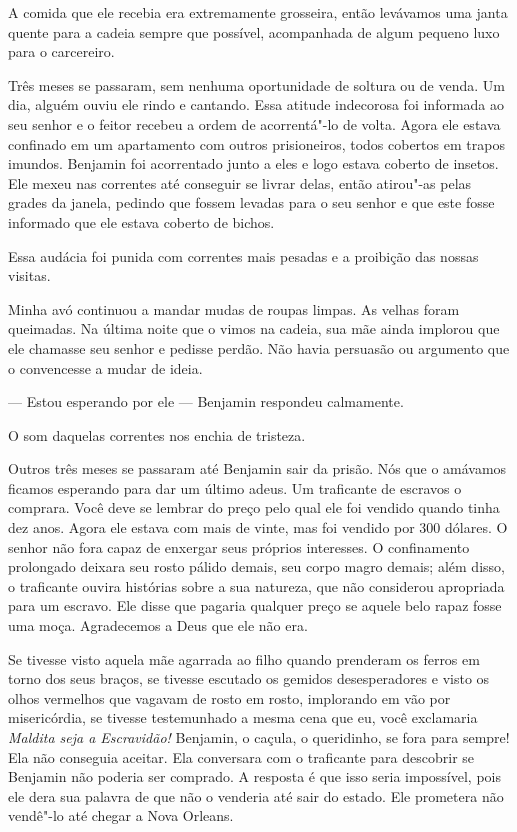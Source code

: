 A comida que ele recebia era
extremamente grosseira, então levávamos uma janta quente para a cadeia
sempre que possível, acompanhada de algum pequeno luxo para o
carcereiro.

Três meses se passaram, sem nenhuma
oportunidade de soltura ou de venda. Um dia, alguém ouviu ele rindo e
cantando. Essa atitude indecorosa foi informada ao seu senhor e o feitor
recebeu a ordem de acorrentá"-lo de volta. Agora ele estava confinado em
um apartamento com outros prisioneiros, todos cobertos em trapos
imundos. Benjamin foi acorrentado junto a eles e logo estava coberto de
insetos. Ele mexeu nas correntes até conseguir se livrar delas, então
atirou"-as pelas grades da janela, pedindo que fossem levadas para o seu
senhor e que este fosse informado que ele estava coberto de bichos.

Essa audácia foi punida com correntes
mais pesadas e a proibição das nossas visitas.

Minha avó continuou a mandar mudas de
roupas limpas. As velhas foram queimadas. Na última noite que o vimos na
cadeia, sua mãe ainda implorou que ele chamasse seu senhor e pedisse
perdão. Não havia persuasão ou argumento que o convencesse a mudar de
ideia.

--- Estou esperando por ele --- Benjamin respondeu calmamente.

O som daquelas correntes nos enchia de
tristeza.

Outros três meses se passaram até
Benjamin sair da prisão. Nós que o amávamos ficamos esperando para dar
um último adeus. Um traficante de escravos o comprara. Você deve se
lembrar do preço pelo qual ele foi vendido quando tinha dez anos. Agora
ele estava com mais de vinte, mas foi vendido por 300 dólares. O senhor
não fora capaz de enxergar seus próprios interesses. O confinamento
prolongado deixara seu rosto pálido demais, seu corpo magro demais; além
disso, o traficante ouvira histórias sobre a sua natureza, que não
considerou apropriada para um escravo. Ele disse que pagaria qualquer
preço se aquele belo rapaz fosse uma moça. Agradecemos a Deus que ele
não era.

Se tivesse visto aquela mãe agarrada ao
filho quando prenderam os ferros em torno dos seus braços, se tivesse
escutado os gemidos desesperadores e visto os olhos vermelhos que
vagavam de rosto em rosto, implorando em vão por misericórdia, se
tivesse testemunhado a mesma cena que eu, você exclamaria \emph{Maldita
seja a Escravidão!} Benjamin, o caçula, o queridinho, se fora para
sempre! Ela não conseguia aceitar. Ela conversara com o traficante para
descobrir se Benjamin não poderia ser comprado. A resposta é que isso
seria impossível, pois ele dera sua palavra de que não o venderia até
sair do estado. Ele prometera não vendê"-lo até chegar a Nova Orleans.

